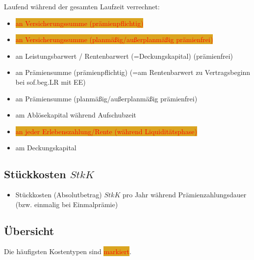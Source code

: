 \documentclass[a4paper,10pt]{article}
\newcommand{\markiert}[1]{\colorbox{Goldenrod}{\textcolor{red}{#1}}}
\begin{document}
Laufend während der gesamten Laufzeit verrechnet:

\begin{itemize}
 \item \markiert{an Versicherungssumme (prämienpflichtig)}
 \item \markiert{an Versicherungssumme (planmäßig/außerplanmäßig prämienfrei)}
 \item an Leistungsbarwert / Rentenbarwert (=Deckungskapital) (prämienfrei) %
 \item an Prämiensumme (prämienpflichtig) (=am Rentenbarwert zu Vertragsbeginn bei sof.beg.LR mit EE)
 \item an Prämiensumme (planmäßig/außerplanmäßig prämienfrei)
 
 \item am Ablösekapital während Aufschubzeit %
 \item \markiert{an jeder Erlebenszahlung/Rente (während Liquiditätsphase)} %
 \item am Deckungskapital %
\end{itemize}


\subsection{Stückkosten $StkK$}

\begin{itemize}
 \item Stückkosten (Absolutbetrag) $StkK$ pro Jahr während Prämienzahlungsdauer (bzw. einmalig bei Einmalprämie)
\end{itemize}


\subsection{Übersicht}

Die häufigsten Kostentypen sind \markiert{markiert}.
\end{document}
